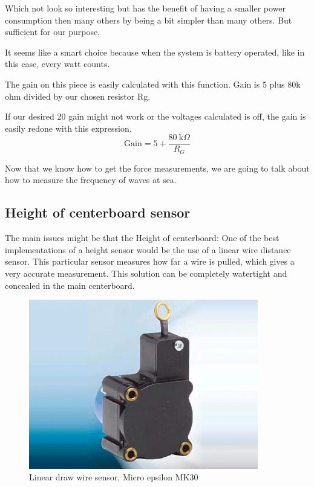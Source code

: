 Which not look so interesting but has the benefit of having a smaller power consumption then many others by being a bit simpler than many others. But sufficient for our purpose.

It seems like a smart choice because when the system is battery operated, like in this case, every watt counts.

The gain on this piece is easily calculated with this function. Gain is 5 plus 80k ohm divided by our chosen resistor Rg. %



If our desired 20 gain might not work or the voltages calculated is off, the gain is easily redone with this expression. %
\begin{equation}%
\textrm{Gain} = 5 + \frac{80~\textrm{k}\Omega}{R_G}
\end{equation}


Now that we know how to get the force measurements, we are going to talk about how to measure the frequency of waves at sea.


\subsection{Height of centerboard sensor}

The main issues might be that the Height of centerboard: %
One of the best implementations of a height sensor would be the use of a linear wire distance sensor. This particular sensor measures how far a wire is pulled, which gives a very accurate measurement. This solution can be completely watertight and concealed in the main centerboard.  

\begin{figure}[H]%
\begin{center}
	\includegraphics[width = 10cm]{Figures/microepsilon_mk30.png}
	\caption{Linear draw wire sensor, Micro epsilon MK30}
	\label{Draw_sensor}
\end{center}
\end{figure}
 
